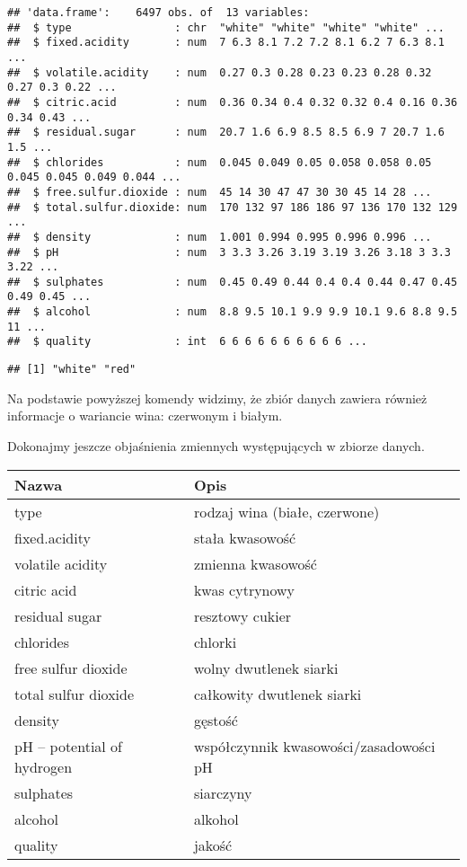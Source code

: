 \documentclass[
]{article}
\newenvironment{Shaded}{\begin{snugshade}}{\end{snugshade}}
\newcommand{\FunctionTok}[1]{\textcolor[rgb]{0.13,0.29,0.53}{\textbf{#1}}}
\newcommand{\NormalTok}[1]{#1}
\newcommand{\SpecialCharTok}[1]{\textcolor[rgb]{0.81,0.36,0.00}{\textbf{#1}}}
\begin{document}
\begin{verbatim}
## 'data.frame':    6497 obs. of  13 variables:
##  $ type                : chr  "white" "white" "white" "white" ...
##  $ fixed.acidity       : num  7 6.3 8.1 7.2 7.2 8.1 6.2 7 6.3 8.1 ...
##  $ volatile.acidity    : num  0.27 0.3 0.28 0.23 0.23 0.28 0.32 0.27 0.3 0.22 ...
##  $ citric.acid         : num  0.36 0.34 0.4 0.32 0.32 0.4 0.16 0.36 0.34 0.43 ...
##  $ residual.sugar      : num  20.7 1.6 6.9 8.5 8.5 6.9 7 20.7 1.6 1.5 ...
##  $ chlorides           : num  0.045 0.049 0.05 0.058 0.058 0.05 0.045 0.045 0.049 0.044 ...
##  $ free.sulfur.dioxide : num  45 14 30 47 47 30 30 45 14 28 ...
##  $ total.sulfur.dioxide: num  170 132 97 186 186 97 136 170 132 129 ...
##  $ density             : num  1.001 0.994 0.995 0.996 0.996 ...
##  $ pH                  : num  3 3.3 3.26 3.19 3.19 3.26 3.18 3 3.3 3.22 ...
##  $ sulphates           : num  0.45 0.49 0.44 0.4 0.4 0.44 0.47 0.45 0.49 0.45 ...
##  $ alcohol             : num  8.8 9.5 10.1 9.9 9.9 10.1 9.6 8.8 9.5 11 ...
##  $ quality             : int  6 6 6 6 6 6 6 6 6 6 ...
\end{verbatim}

\begin{Shaded}
\end{Shaded}

\begin{verbatim}
## [1] "white" "red"
\end{verbatim}

Na podstawie powyższej komendy widzimy, że zbiór danych zawiera również
informacje o wariancie wina: czerwonym i białym.

Dokonajmy jeszcze objaśnienia zmiennych występujących w zbiorze danych.

\begin{longtable}[]{@{}ll@{}}
\toprule\noalign{}
Nazwa & Opis \\
\midrule\noalign{}
\endhead
\bottomrule\noalign{}
\endlastfoot
type & rodzaj wina (białe, czerwone) \\
fixed.acidity & stała kwasowość \\
volatile acidity & zmienna kwasowość \\
citric acid & kwas cytrynowy \\
residual sugar & resztowy cukier \\
chlorides & chlorki \\
free sulfur dioxide & wolny dwutlenek siarki \\
total sulfur dioxide & całkowity dwutlenek siarki \\
density & gęstość \\
pH -- potential of hydrogen & współczynnik kwasowości/zasadowości pH \\
sulphates & siarczyny \\
alcohol & alkohol \\
quality & jakość \\
\end{longtable}
\end{document}
